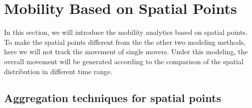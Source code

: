 \chapter{Mobility Based on Spatial Points}
\label{chap:intro}

In this section, we will introduce the mobility analytics based on spatial points. To make the spatial points different from the the other two modeling methods, here we will not track the movement of single movers. Under this modeling, the overall movement will be generated according to the comparison of the spatial distribution in different time range.

\section{Aggregation techniques for spatial points}